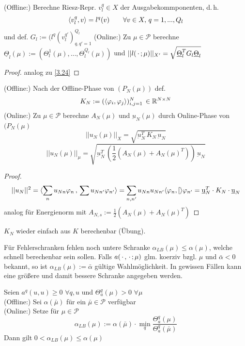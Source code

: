 \begin{kor}
	(Offline:) Berechne Riesz-Repr. $v_l^q \in X$ der Ausgabekommponenten, d.\,h.
	\[
		\langle v_l^q, v \rangle = l^q(v) \qquad \forall v \in X, \, q=1,...,Q_l
	\]
	und def. $G_l := (l^q(v_l^{q'})_{q, q' =1}^{Q_l}$
	(Online:) Zu $\mu \in \mathcal{P}$ berechne $\underline{\Theta}_l (\mu) := (\Theta_l^1(\mu),...,\Theta_l^{Q_l}(\mu))$ und $||l(\,\cdot\,;\mu)||_{X'} = \sqrt{\underline{\Theta}_l^T G_l \underline{\Theta}_l}$
\end{kor}

\begin{proof}
	analog zu \ref{3.24}
\end{proof}

\begin{kor}
	(Offline:) Nach der Offline-Phase von $(P_N(\mu))$ def.
	\[
		K_N := (\langle \varphi_i, \varphi_j \rangle)_{i,j=1}^N \, \in \mathbb{R}^{N \times N}
	\]
	(Online:) Zu $\mu \in \mathcal{P}$ berechne $A_N(\mu)$ und $\underbar u_N(\mu)$ durch Online-Phase von $(P_N(\mu)$
	\[
		|| u_N(\mu)||_X = \sqrt{\underbar u_N^T \, K_N \, \underbar u_N}
	\]
	\[
		|| u_N(\mu)||_{\mu} = \sqrt{\underbar u_N^T \, (\frac{1}{2} (A_N(\mu) + A_N(\mu)^T)) \, \underbar u_N}
	\]
\end{kor}

\begin{proof}
	\begin{align*}
		||u_N||^2 = \langle \sum_n u_{Nn} \varphi_n \, ,  \, \sum u_{Nn'} \varphi_{n'} \rangle = \sum_{n, n'} u_{Nn} u_{Nn'} \langle \varphi_n, [ \rangle{\varphi_{n'}} = \underbar u_N^T \cdot K_N \cdot \underbar u_N
	\end{align*}	
	analog für Energienorm mit $A_{N,s} := \frac{1}{2} (A_N(\mu) + A_N(\mu)^T)$
\end{proof}

\begin{bem}
	$K_N$ wieder einfach aus $K$ berechenbar (Übung).
\end{bem}

Für Fehlerschranken fehlen noch untere Schranke $\alpha_{LB} (\mu) \le \alpha (\mu)$, welche schnell berechenbar sein sollen.
Falls $a(\,\cdot\, , \,\cdot\, ; \mu)$ glm. koerziv bzgl. $\mu$ und $\bar{\alpha} < 0$ bekannt, so ist $\alpha_{LB} (\mu) := \bar{\alpha}$ gültige Wahlmöglichkeit.
In gewissen Fällen kann eine größere und damit bessere Schranke angegeben werden.

\begin{satz}
	Seien $a^q(u,u) \geq 0 \,\, \forall q,u$ und $\Theta_a^q (\mu) > 0 \,\, \forall \mu$ \\
	(Offline:) Sei $\alpha(\bar{\mu})$ für ein $\bar{\mu} \in \mathcal{P}$ verfügbar \\
	(Online:) Setze für $\mu \in \mathcal{P}$
	\[
		\alpha_{LB} (\mu) := \alpha(\bar{\mu}) \cdot \min_{q} \frac{\Theta_a^q(\mu)}{\Theta_a^q(\bar{\mu})}
	\]
	Dann gilt $0 < \alpha_{LB} (\mu) \leq \alpha(\mu)$
\end{satz}

